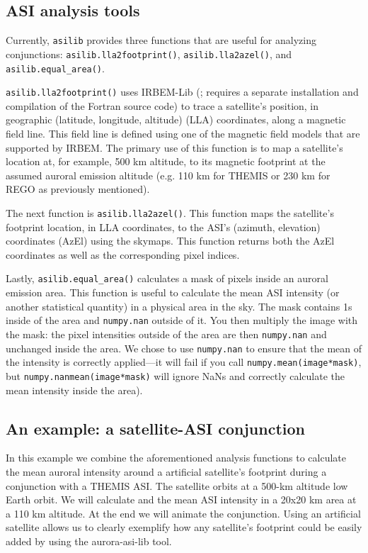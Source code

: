 \documentclass[utf8]{FrontiersinHarvard} %
\begin{document}
\subsection{ASI analysis tools}
Currently, \verb|asilib| provides three functions that are useful for analyzing conjunctions: \verb|asilib.lla2footprint()|, \verb|asilib.lla2azel()|, and \verb|asilib.equal_area()|.

\verb|asilib.lla2footprint()| uses IRBEM-Lib (\citep{irbem}; requires a separate installation and compilation of the Fortran source code) to trace a satellite's position, in geographic (latitude, longitude, altitude) (LLA) coordinates, along a magnetic field line. This field line is defined using one of the magnetic field models that are supported by IRBEM. The primary use of this function is to map a satellite's location at, for example, 500 km altitude, to its magnetic footprint at the assumed auroral emission altitude (e.g. 110 km for THEMIS or 230 km for REGO as previously mentioned).

The next function is \verb|asilib.lla2azel()|. This function maps the satellite's footprint location, in LLA coordinates, to the ASI's (azimuth, elevation) coordinates (AzEl) using the skymaps. This function returns both the AzEl coordinates as well as the corresponding pixel indices.

Lastly, \verb|asilib.equal_area()| calculates a mask of pixels inside an auroral emission area. This function is useful to calculate the mean ASI intensity (or another statistical quantity) in a physical area in the sky. The mask contains 1s inside of the area and \verb|numpy.nan| outside of it. You then multiply the image with the mask: the pixel intensities outside of the area are then \verb|numpy.nan| and unchanged inside the area. We chose to use \verb|numpy.nan| to ensure that the mean of the intensity is correctly applied---it will fail if you call \verb|numpy.mean(image*mask)|, but \verb|numpy.nanmean(image*mask)| will ignore NaNs and correctly calculate the mean intensity inside the area).

\subsection{An example: a satellite-ASI conjunction}\label{satellite_conjunction}
In this example we combine the aforementioned analysis functions to calculate the mean auroral intensity around a artificial satellite's footprint during a conjunction with a THEMIS ASI. The satellite orbits at a 500-km altitude low Earth orbit. We will calculate and the mean ASI intensity in a 20x20 km area at a 110 km altitude. At the end we will animate the conjunction. Using an artificial satellite allows us to clearly exemplify how any satellite's footprint could be easily added by using the aurora-asi-lib tool. 
\end{document}
